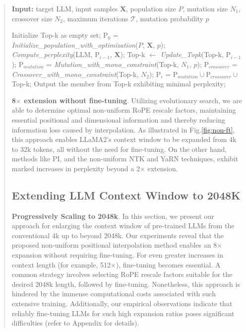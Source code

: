 \begin{abstract}
\begin{algorithm}[t]
	\small
	\caption{The search algorithm}
	\textbf{Input:} target LLM, input samples $\mathbf{X}$, population size $P$, mutation size $N_1$, crossover size $N_2$, maximum iterations $\mathcal{T}$, mutation probability $p$\\

	\begin{algorithmic}[1]
		\label{alg:search}
		\STATE Initialize Top-k as empty set;	
		\STATE $\text{P}_0$ = \textit{Initialize\_population\_with\_optimization}($P$, $\mathbf{X}$, $p$); 
		\STATE \textit{Compute\_perplexity}(LLM, $\text{P}_{i-1}$, $\mathbf{X}$);
		\STATE Top-k $\gets$ \textit{Update\_Topk}(Top-k, $\text{P}_{i-1}$);
		\STATE $\text{P}_{mutation}$ = \textit{Mutation\_with\_mono\_constraint}(Top-k, $N_1$, $p$); 
		\STATE $\text{P}_{crossover}$ = \textit{Crossover\_with\_mono\_constraint}(Top-k, $N_2$);
		\STATE $\text{P}_i$ = $\text{P}_{mutation} \cup \text{P}_{crossover} \cup$ Top-k;
		\ENDFOR
		\STATE Output the member from Top-k exhibiting minimal perplexity;
	\end{algorithmic}
\end{algorithm}

\textbf{8$\times$ extension without fine-tuning}. Utilizing evolutionary search, we are able to determine optimal non-uniform RoPE rescale factors, maintaining essential positional and dimensional information and thereby reducing information loss caused by interpolation. As illustrated in Fig.\ref{fig:non-ft}, this approach enables LLaMA2's context window to be expanded from 4k to 32k tokens, all without the need for fine-tuning. On the other hand, methods like PI, and the non-uniform NTK and YaRN techniques, exhibit marked increases in perplexity beyond a 2$\times$ extension.

\subsection{Extending LLM Context Window to 2048K}
\label{sec:extendto2048k}

\textbf{Progressively Scaling to 2048k}. In this section, we present our approach for enlarging the context window of pre-trained LLMs from the conventional 4k up to beyond 2048k. Our experiments reveal that the proposed non-uniform positional interpolation method enables an 8$\times$ expansion without requiring fine-tuning. For even greater increases in context length (for example, 512$\times$), fine-tuning becomes essential. A common strategy involves selecting RoPE rescale factors suitable for the desired 2048k length, followed by fine-tuning. Nonetheless, this approach is hindered by the immense computational costs associated with such extensive training. Additionally, our empirical observations indicate that reliably fine-tuning LLMs for such high expansion ratios poses significant difficulties (refer to Appendix for details).


\end{abstract}
